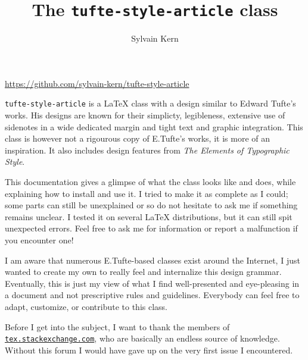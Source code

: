 \documentclass[raggedright, twoside, 11pt, colorful]{tufte-style-article}
\title{The \texttt{tufte-style-article} class}
\author{Sylvain Kern}
\begin{document}
\maketitle

\vskip -25pt
\noindent\hspace{.1\textwidth}\url{https://github.com/sylvain-kern/tufte-style-article}
\vskip 25pt

\noindent
\texttt{tufte-style-article} is a \LaTeX{} class with a design similar to Edward Tufte's works. His designs are known for their simplicty, legibleness, extensive use of sidenotes in a wide dedicated margin and tight text and graphic integration. This class is however not a rigourous copy of E.Tufte's works, it is more of an inspiration. It also includes design features from \textit{The Elements of Typographic Style}.

This documentation gives a glimpse of what the class looks like and does, while explaining how to install and use it. I tried to make it as complete as I could; some parts can still be unexplained or so do not hesitate to ask me if something remains unclear. I tested it on several \LaTeX{} distributions, but it can still spit unexpected errors. Feel free to ask me for information or report a malfunction if you encounter one!

I am aware that numerous E.Tufte-based classes exist around the Internet, I just wanted to create my own to really feel and internalize this design grammar. Eventually, this is just my view of what I find well-presented and eye-pleasing in a document and not prescriptive rules and guidelines. Everybody can feel free to adapt, customize, or contribute to this class.

Before I get into the subject, I want to thank the members of\\\noindent \href{www.tex.stackexchange.com}{\texttt{tex.stackexchange.com}}, who are basically an endless source of knowledge. Without this forum I would have gave up on the very first issue I encountered.

\newpage
\tableofcontents
\newpage
\end{document}
